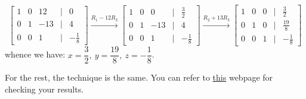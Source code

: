 \begin{solution}
\[\begin{bmatrix}
     1&0&12&\vert&0\\
     0&1&-13&\vert&4\\
     0&0&1&\vert&-\frac{1}{8}
 \end{bmatrix} 
 \xrightarrow{R_1-12R_3}
 \begin{bmatrix}
     1&0&0&\vert&\frac{3}{2}\\
     0&1&-13&\vert&4\\
     0&0&1&\vert&-\frac{1}{8}
 \end{bmatrix} 
 \xrightarrow{R_2+13R_3}
 \begin{bmatrix}
     1&0&0&\vert&\frac{3}{2}\\
     0&1&0&\vert&\frac{19}{8}\\
     0&0&1&\vert&-\frac{1}{8}
 \end{bmatrix} 
 \]
 whence we have: $x=\dfrac{3}{2},\: y=\dfrac{19}{8},\: z=-\dfrac{1}{8}$.

For the rest, the technique is the same. You can refer to \href{https://matrixcalc.org/slu.html}{this} webpage for checking your results.
\end{solution}




        
        
        

